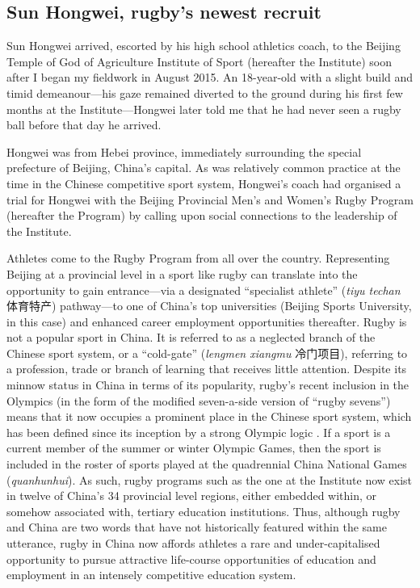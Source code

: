                                   \begin{CJK}{UTF8}{gbsn}

\section{Sun Hongwei, rugby's newest recruit}
Sun Hongwei arrived, escorted by his high school athletics coach, to the Beijing Temple of God of Agriculture Institute of Sport (hereafter the Institute) soon after I began my fieldwork in August 2015.  An 18-year-old with a slight build and timid demeanour---his gaze remained diverted to the ground during his first few months at the Institute---Hongwei later told me that he had never seen a rugby ball before that day he arrived.

Hongwei was from Hebei province, immediately surrounding the special prefecture of Beijing, China's capital.  As was relatively common practice at the time in the Chinese competitive sport system, Hongwei's coach had organised a trial for Hongwei with the Beijing Provincial Men’s and Women's Rugby Program (hereafter the Program) by calling upon social connections to the leadership of the Institute.

Athletes come to the Rugby Program from all over the country.  Representing Beijing at a provincial level in a sport like rugby can translate into the opportunity to gain entrance---via a designated ``specialist athlete'' (\textit{tiyu techan} 体育特产) pathway---to one of China's top universities (Beijing Sports University, in this case) and enhanced career employment opportunities thereafter.  Rugby is not a popular sport in China.  It is referred to as a neglected branch of the Chinese sport system, or a ``cold-gate'' (\textit{lengmen xiangmu} 冷门项目), referring to a profession, trade or branch of learning that receives little attention.  Despite its minnow status in China in terms of its popularity, rugby's recent inclusion in the Olympics (in the form of the modified seven-a-side version of ``rugby sevens'') means that it now occupies a prominent place in the Chinese sport system, which has been defined since its inception by a strong Olympic logic \citep{Brownell2008}.  If a sport is a current member of the summer or winter Olympic Games, then the sport is included in the roster of sports played at the quadrennial China National Games (\textit{quanhunhui}).  As such, rugby programs such as the one at the Institute now exist in twelve of China's 34 provincial level regions, either embedded within, or somehow associated with, tertiary education institutions.  Thus, although rugby and China are two words that have not historically featured within the same utterance, rugby in China now affords athletes a rare and under-capitalised opportunity to pursue attractive life-course opportunities of education and employment in an intensely competitive education system.


\end{CJK}
